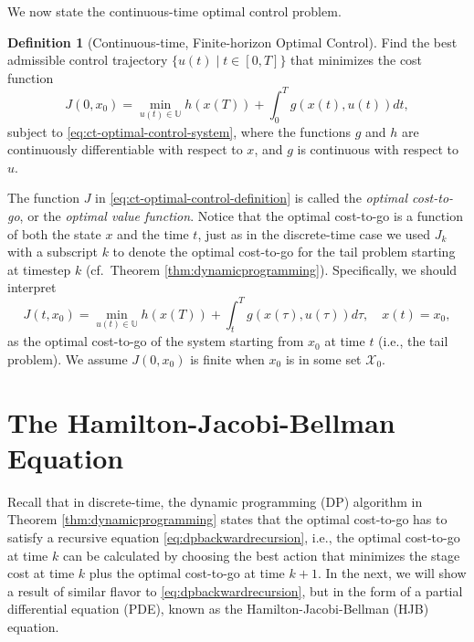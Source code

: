 \documentclass[
]{book}
\theoremstyle{definition}
\newtheorem{definition}{Definition}[chapter]
\theoremstyle{definition}
\theoremstyle{definition}
\theoremstyle{definition}
\theoremstyle{remark}
\begin{document}
We now state the continuous-time optimal control problem.

\begin{definition}[Continuous-time, Finite-horizon Optimal Control]
\protect\hypertarget{def:continuoustimeoptimalcontrol}{}\label{def:continuoustimeoptimalcontrol}Find the best admissible control trajectory \(\{u(t) \mid t \in [0,T] \}\) that minimizes the cost function
\begin{equation}
J(0,x_0) = \min_{u(t) \in \mathbb{U}} h(x(T)) + \int_0^T g(x(t),u(t)) dt,
\label{eq:ct-optimal-control-definition}
\end{equation}
subject to \eqref{eq:ct-optimal-control-system}, where the functions \(g\) and \(h\) are continuously differentiable with respect to \(x\), and \(g\) is continuous with respect to \(u\).
\end{definition}

The function \(J\) in \eqref{eq:ct-optimal-control-definition} is called the \emph{optimal cost-to-go}, or the \emph{optimal value function}. Notice that the optimal cost-to-go is a function of both the state \(x\) and the time \(t\), just as in the discrete-time case we used \(J_k\) with a subscript \(k\) to denote the optimal cost-to-go for the tail problem starting at timestep \(k\) (cf.~Theorem \ref{thm:dynamicprogramming}). Specifically, we should interpret
\[
J(t,x_0) = \min_{u(t) \in \mathbb{U}} h(x(T)) + \int_t^T g(x(\tau),u(\tau)) d\tau, \quad x(t) = x_0,
\]
as the optimal cost-to-go of the system starting from \(x_0\) at time \(t\) (i.e., the tail problem).
We assume \(J(0,x_0)\) is finite when \(x_0\) is in some set \(\mathcal{X}_0\).

\hypertarget{the-hamilton-jacobi-bellman-equation}{%
\section{The Hamilton-Jacobi-Bellman Equation}\label{the-hamilton-jacobi-bellman-equation}}

Recall that in discrete-time, the dynamic programming (DP) algorithm in Theorem \ref{thm:dynamicprogramming} states that the optimal cost-to-go has to satisfy a recursive equation \eqref{eq:dpbackwardrecursion}, i.e., the optimal cost-to-go at time \(k\) can be calculated by choosing the best action that minimizes the stage cost at time \(k\) plus the optimal cost-to-go at time \(k+1\). In the next, we will show a result of similar flavor to \eqref{eq:dpbackwardrecursion}, but in the form of a partial differential equation (PDE), known as the Hamilton-Jacobi-Bellman (HJB) equation.
\end{document}
